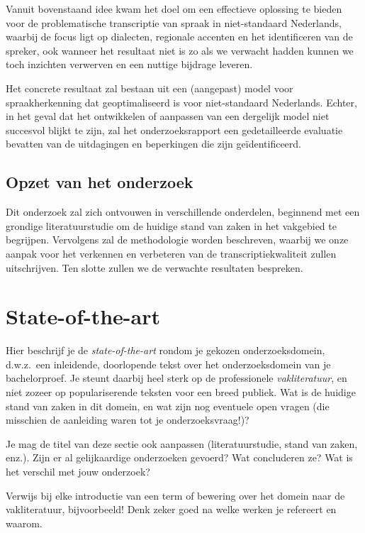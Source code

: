 Vanuit bovenstaand idee kwam het doel om een effectieve oplossing te bieden voor de problematische transcriptie van spraak in niet-standaard Nederlands, waarbij de focus ligt op dialecten, regionale accenten en het identificeren van de spreker, ook wanneer het resultaat niet is zo als we verwacht hadden kunnen we toch inzichten verwerven en een nuttige bijdrage leveren.

Het concrete resultaat zal bestaan uit een (aangepast) model voor spraakherkenning dat geoptimaliseerd is voor niet-standaard Nederlands. Echter, in het geval dat het ontwikkelen of aanpassen van een dergelijk model niet succesvol blijkt te zijn, zal het onderzoeksrapport een gedetailleerde evaluatie bevatten van de uitdagingen en beperkingen die zijn geïdentificeerd.

\subsection{Opzet van het onderzoek}
Dit onderzoek zal zich ontvouwen in verschillende onderdelen, beginnend met een grondige literatuurstudie om de huidige stand van zaken in het vakgebied te begrijpen. Vervolgens zal de methodologie worden beschreven, waarbij we onze aanpak voor het verkennen en verbeteren van de transcriptiekwaliteit zullen uitschrijven. Ten slotte zullen we de verwachte resultaten bespreken.




\section{State-of-the-art}%
\label{sec:state-of-the-art}

Hier beschrijf je de \emph{state-of-the-art} rondom je gekozen onderzoeksdomein, d.w.z.\ een inleidende, doorlopende tekst over het onderzoeksdomein van je bachelorproef. Je steunt daarbij heel sterk op de professionele \emph{vakliteratuur}, en niet zozeer op populariserende teksten voor een breed publiek. Wat is de huidige stand van zaken in dit domein, en wat zijn nog eventuele open vragen (die misschien de aanleiding waren tot je onderzoeksvraag!)?

Je mag de titel van deze sectie ook aanpassen (literatuurstudie, stand van zaken, enz.). Zijn er al gelijkaardige onderzoeken gevoerd? Wat concluderen ze? Wat is het verschil met jouw onderzoek?

Verwijs bij elke introductie van een term of bewering over het domein naar de vakliteratuur, bijvoorbeeld! Denk zeker goed na welke werken je refereert en waarom.

